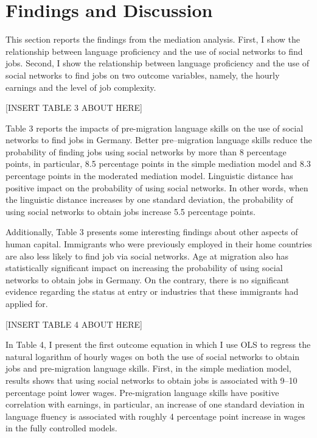 \documentclass[12pt,a4paper]{article}
\begin{document}
\section{Findings and Discussion}

This section reports the findings from the mediation analysis. First, I show the relationship between language proficiency and the use of social networks to find jobs. Second, I show the relationship between language proficiency and the use of social networks to find jobs on two outcome variables, namely, the hourly earnings and the level of job complexity. 

\begin{center}
[INSERT TABLE 3 ABOUT HERE]
\end{center}

Table 3 reports the impacts of pre-migration language skills on the use of social networks to find jobs in Germany. Better pre--migration language skills reduce the probability of finding jobs using social networks by more than 8 percentage points, in particular, 8.5 percentage points in the simple mediation model and 8.3 percentage points in the moderated mediation model. Linguistic distance has positive impact on the probability of using social networks. In other words, when the linguistic distance increases by one standard deviation, the probability of using social networks to obtain jobs increase 5.5 percentage points. 

Additionally, Table 3 presents some interesting findings about other aspects of human capital. Immigrants who were previously employed in their home countries are also less likely to find job via social networks. Age at migration also has statistically significant impact on increasing the probability of using social networks to obtain jobs in Germany. On the contrary, there is no significant evidence regarding the status at entry or industries that these immigrants had applied for.

\begin{center}
[INSERT TABLE 4 ABOUT HERE]
\end{center}

In Table 4, I present the first outcome equation in which I use OLS to regress the natural logarithm of hourly wages on both the use of social networks to obtain jobs and pre-migration language skills. First, in the simple mediation model, results shows that using social networks to obtain jobs is associated with 9--10 percentage point lower wages. Pre-migration language skills have positive correlation with earnings, in particular, an increase of one standard deviation in language fluency is associated with roughly 4 percentage point increase in wages in the fully controlled models. 
\end{document}
